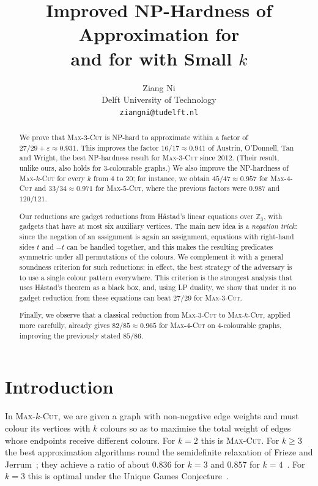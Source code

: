\documentclass[11pt,letterpaper]{article}
\title{Improved NP-Hardness of Approximation for \MC{3}\\ and for \MC{k} with Small $k$}
\author{Ziang Ni\\[2pt] {\normalsize Delft University of Technology}\\ {\normalsize\texttt{ziangni@tudelft.nl}}}
\date{}
\theoremstyle{remark}
\newcommand{\MC}[1]{\textup{\textsc{Max-$#1$-Cut}}}
\newcommand{\Z}{\mathbb{Z}}
\newcommand{\eps}{\varepsilon}
\begin{document}
\maketitle
\thispagestyle{empty}

\begin{abstract}
We prove that \MC{3} is NP-hard to approximate within a factor of $27/29+\eps\approx 0.931$. This
improves the factor $16/17\approx 0.941$ of Austrin, O'Donnell, Tan and Wright, the best NP-hardness
result for \MC{3} since 2012. (Their result, unlike ours, also holds for $3$-colourable graphs.) We also
improve the NP-hardness of \MC{k} for every $k$ from $4$ to $20$; for instance, we obtain $45/47\approx0.957$
for \MC{4} and $33/34\approx0.971$ for \MC{5}, where the previous factors were $0.987$ and $120/121$.

Our reductions are gadget reductions from H\aa stad's linear equations over $\Z_3$, with gadgets that have
at most six auxiliary vertices. The main new idea is a \emph{negation trick}: since the
negation of an assignment is again an assignment, equations with right-hand sides $t$ and $-t$ can be
handled together, and this makes the resulting predicates symmetric under all permutations of the
colours. We complement it with a general soundness criterion for such reductions: in effect, the best
strategy of the adversary is to use a single colour pattern everywhere. This criterion is the strongest
analysis that uses H\aa stad's theorem as a black box, and, using LP duality, we show that under it no
gadget reduction from these equations can beat $27/29$ for \MC{3}.

Finally, we observe that a classical reduction from \MC{3} to \MC{k}, applied more carefully, already
gives $82/85\approx0.965$ for \MC{4} on $4$-colourable graphs, improving the previously stated $85/86$.
\end{abstract}

\newpage
\setcounter{tocdepth}{2}
\tableofcontents
\thispagestyle{empty}
\newpage
\setcounter{page}{1}

\section{Introduction}

In \MC{k}, we are given a graph with non-negative edge weights and must colour its vertices with $k$
colours so as to maximise the total weight of edges whose endpoints receive different colours. For $k=2$
this is \textsc{Max-Cut}. For $k\ge 3$ the best approximation algorithms round the semidefinite
relaxation of Frieze and Jerrum~\cite{FJ97}; they achieve a ratio of about $0.836$ for $k=3$ and $0.857$
for $k=4$~\cite{GW04,dKPW04}. For $k=3$ this is optimal under the Unique Games
Conjecture~\cite{IM12,Heilman26}.
\end{document}
